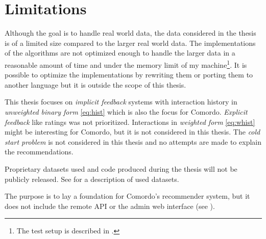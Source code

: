 
\section{Limitations}\label{sec:intro:limitations}

Although the goal is to handle real world data, the data considered in the thesis is of a limited size compared to the larger real world data. The implementations of the algorithms are not optimized enough to handle the larger data in a reasonable amount of time and under the memory limit of my machine\footnote{The test setup is described in .}.  It is possible to optimize the implementations by rewriting them or porting them to another language but it is outside the scope of this thesis.

This thesis focuses on \textit{implicit feedback} systems with interaction history in \textit{unweighted binary form} \eqref{eq:hist} which is also the focus for Comordo. \textit{Explicit feedback} like ratings was not prioritized. Interactions in \textit{weighted form} \eqref{eq:whist} might be interesting for Comordo, but it is not considered in this thesis. The \textit{cold start problem} \citep{cacheda2011comparison} is not considered in this thesis and no attempts are made to explain the recommendations.

Proprietary datasets used and code produced during the thesis will not be publicly released. See  for a description of used datasets.

The purpose is to lay a foundation for Comordo's recommender system, but it does not include the remote API or the admin web interface (see ).

